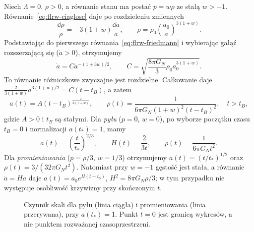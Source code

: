 \begin{przyklad}
\label{prz:flrw-rozwiazanie-ode}
Niech $\Lambda=0$, $\rho>0$, a równanie stanu ma postać
$p=w\rho$ ze stałą $w>-1$. Równanie~\eqref{eq:flrw-ciaglosc}
daje po rozdzieleniu zmiennych
\[
 \frac{\dd\rho}{\rho}=-3(1+w)\frac{\dd a}{a},
 \qquad \rho=\rho_0\left(\frac{a_0}{a}\right)^{3(1+w)}.
\]
Podstawiając do pierwszego równania~\eqref{eq:flrw-friedmann}
i wybierając gałąź rozszerzającą się ($\dot a>0$), otrzymujemy
\[
 \dot a=C a^{-(1+3w)/2},\qquad
 C=\sqrt{\frac{8\pi G_{\!N}}{3}\rho_0a_0^{3(1+w)}}.
\]
To równanie różniczkowe zwyczajne jest rozdzielne.
Całkowanie daje
$\frac{2}{3(1+w)}a^{3(1+w)/2}=C(t-t_B)$,
a zatem
\begin{equation}\label{eq:flrw-power-law}
 a(t)=A(t-t_B)^{\frac{2}{3(1+w)}},\qquad
 \rho(t)=\frac{1}{6\pi G_{\!N}(1+w)^2(t-t_B)^2},
 \quad t>t_B,
\end{equation}
gdzie $A>0$ i $t_B$ są stałymi.
Dla \emph{pyłu} ($p=0$, $w=0$), po wyborze początku czasu
$t_B=0$ i normalizacji $a(t_*)=1$, mamy
\begin{equation}\label{eq:flrw-dust}
 a(t)=\left(\frac{t}{t_*}\right)^{2/3},\qquad
 H(t)=\frac{2}{3t},\qquad
 \rho(t)=\frac{1}{6\pi G_{\!N}t^2}.
\end{equation}
Dla \emph{promieniowania} ($p=\rho/3$, $w=1/3$)
otrzymujemy $a(t)=(t/t_*)^{1/2}$ oraz
$\rho(t)=3/(32\pi G_{\!N}t^2)$.
Natomiast przy $w=-1$ gęstość jest stała, a równanie
$\dot a=Ha$ daje $a(t)=a_0e^{H(t-t_0)}$,
$H^2=8\pi G_{\!N}\rho/3$; w tym przypadku
nie występuje osobliwość krzywizny przy skończonym $t$.

\begin{figure}[H]
\centering
{}
\caption{Czynnik skali dla pyłu (linia ciągła) i promieniowania
(linia przerywana), przy $a(t_*)=1$. Punkt $t=0$ jest granicą
wykresów, a nie punktem rozważanej czasoprzestrzeni.}
\label{fig:flrw-skala}
\end{figure}
\end{przyklad}

